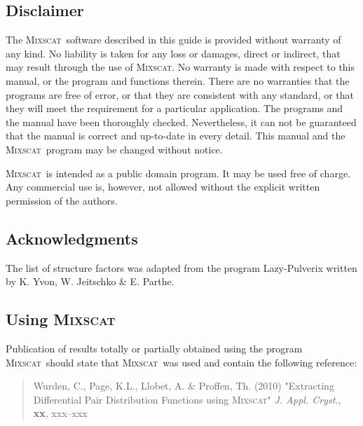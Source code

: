 \documentclass[12pt]{report}
\newcommand{\mixscat}{\textsc {Mixscat}}
\newcommand{\Mixscat}{\textsc {Mixscat\ }}
\begin{document}
\subsection*{Disclaimer}

The \Mixscat software described in this guide is
provided without warranty of any kind.  No liability is taken for any loss
or damages, direct or indirect, that may result through the use of \mixscat.  No warranty is made with respect to this manual, or the program
and functions therein.  There are no warranties that the programs are free
of error, or that they are consistent with any standard, or that they will
meet the requirement for a particular application.  The programs and the
manual have been thoroughly checked.  Nevertheless, it can not be
guaranteed that the manual is correct and up-to-date in every detail. This
manual and the \Mixscat program may be changed without notice.\par

\Mixscat is intended as a public domain program.  It may be used free
of charge.  Any commercial use is, however, not allowed without the
explicit written permission of the authors.


\subsection*{Acknowledgments}

The list of structure factors was adapted from the program
Lazy-Pulverix written by K.  Yvon, W.  Jeitschko \& E.  Parthe.


\subsection*{Using \mixscat}

Publication of results totally or partially obtained using the program \Mixscat should state that \Mixscat was used and contain the following
reference:

\begin{quote}
  {\sc Wurden, C., Page, K.L., Llobet, A. \& Proffen, Th.} (2010)
  "Extracting Differential Pair Distribution Functions using \mixscat"
  {\it J. Appl. Cryst.}, {\bf xx}, xxx--xxx
\end{quote}
\end{document}
